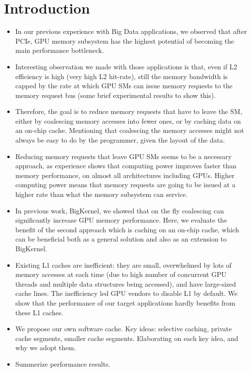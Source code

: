\section{Introduction}

\begin{itemize}

\item In our previous experience with Big Data applications, we observed that after PCIe, GPU memory subsystem has the
highest potential of becoming the main performance bottleneck.

\item Interesting observation we made with those applications is that, even if L2 efficiency is high (very high L2
hit-rate), still the memory bandwidth is capped by the rate at which GPU SMs can issue memory requests to the memory
request bus (some brief experimental results to show this).

\item Therefore, the goal is to reduce memory requests that have to leave the SM, either by coalescing memory accesses
into fewer ones, or by caching data on an on-chip cache. Mentioning that coalescing the memory accesses might not always
be easy to do by the programmer, given the layout of the data.

\item Reducing memory requests that leave GPU SMs seems to be a necessary approach, as experience shows that computing
power improves faster than memory performance, on almost all architectures including GPUs. Higher computing power means
that memory requests are going to be issued at a higher rate than what the memory subsystem can service.

\item In previous work, BigKernel, we showed that on the fly coalescing can significantly increase GPU memory
performance. Here, we evaluate the benefit of the second approach which is caching on an on-chip cache, which can be
beneficial both as a general solution and also as an extension to BigKernel.

\item Existing L1 caches are inefficient: they are small, overwhelmed by lots of memory accesses at each time (due to
high number of concurrent GPU threads and multiple data structures being accessed), and have large-sized cache lines.
The inefficiency led GPU vendors to disable L1 by default. We show that the performance of our target applications
hardly benefits from these L1 caches.

\item We propose our own software cache. Key ideas: selective caching, private cache segments, smaller cache segments.
Elaborating on each key idea, and why we adopt them.

\item Summerize performance results.


\end{itemize}


